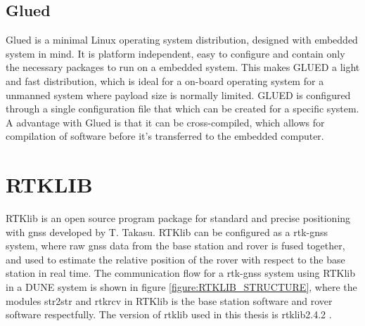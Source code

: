 \subsection{Glued}
Glued is a minimal Linux operating system distribution, designed with embedded system in mind. It is platform independent, easy to configure and contain only the necessary packages to run on a embedded system. This makes GLUED a light and fast distribution, which is ideal for a on-board operating system for a unmanned system where payload size is normally limited. GLUED is configured through a single configuration file that which can be created for a specific system. A advantage with Glued is that it can be cross-compiled, which allows for compilation of software before it's transferred to the embedded computer.
\section{RTKLIB}\label{ss:Rtklib}
RTKlib \citep{takasu2009development} is an open source program package for standard and precise positioning with \gls{gnss} developed by T. Takasu. RTKlib can be configured as a \gls{rtk-gnss} system, where raw \gls{gnss} data from the base station and rover is fused together, and used to estimate the relative position of the rover with respect to the base station in real time. The communication flow for a \gls{rtk-gnss} system using RTKlib in a DUNE system is shown in figure \ref{figure:RTKLIB_STRUCTURE}, where the modules str2str and rtkrcv in RTKlib is the base station software and rover software respectfully. The version of \gls{rtklib} used in this thesis is \gls{rtklib}2.4.2 \citep{Rtklib242}.

